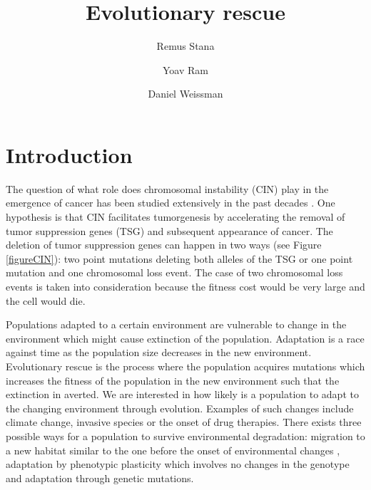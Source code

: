 \documentclass[11pt,a4paper]{article}
\begin{document}
\title{Evolutionary rescue}
\author[1]{Remus Stana}
\author[1]{Yoav Ram}
\author[2]{‪Daniel Weissman}
\maketitle
\begin{abstract}
\end{abstract}

\section{Introduction}
The question of what role does chromosomal instability (CIN) play in the emergence of cancer has been studied extensively in the past decades \cite{michor2005can,christine2018understanding,nowak2002role,pavelka2010dr,komarova2003mutation,zhu2018cellular}. One hypothesis is that CIN facilitates tumorgenesis by accelerating the removal of tumor suppression genes (TSG) and subsequent appearance of cancer. The deletion of tumor suppression genes can happen in two ways (see Figure \ref{figureCIN}): two point mutations deleting both alleles of the TSG or one point mutation and one chromosomal loss event. The case of two chromosomal loss events is taken into consideration because the fitness cost would be very large and the cell would die.

Populations adapted to a certain environment are vulnerable to change in the environment which might cause extinction of the population. Adaptation is a race against time as the population size decreases in the new environment. Evolutionary rescue is the process where the population acquires mutations which increases the fitness of the population in the new environment such that the extinction in averted. We are interested in how likely is a population to adapt to the changing environment through evolution. Examples of such changes include climate change, invasive species or the onset of drug therapies. There exists three possible ways for a population to survive environmental degradation: migration to a new habitat similar to the one before the onset of environmental changes \cite{cobbold2020should}, adaptation by phenotypic plasticity which involves no changes in the genotype\cite{carja2019evolutionary,carja2017evolutionary} and adaptation through genetic mutations\cite{uecker2014evolutionary,uecker2016role,uecker2011fixation}.
\end{document}
